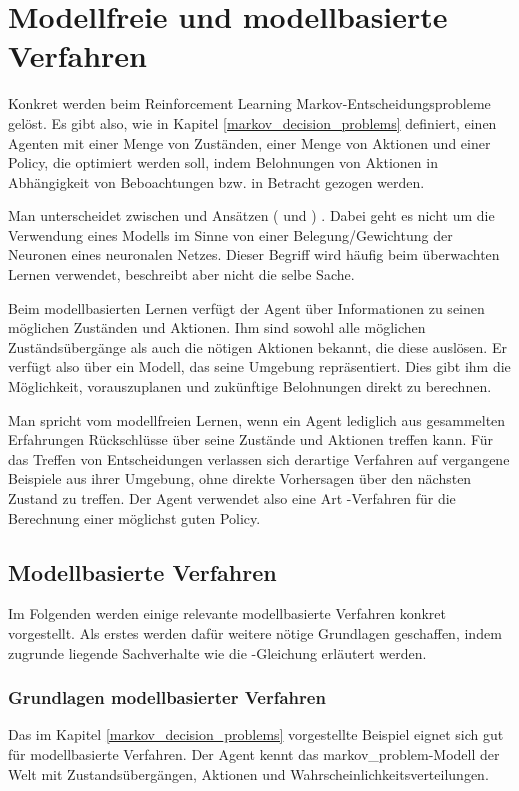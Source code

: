 \section{Modellfreie und modellbasierte Verfahren}\label{reinforcement_learning_basics}
Konkret werden beim Reinforcement Learning Markov-Entscheidungsprobleme gelöst. Es gibt also, wie in Kapitel \ref{markov_decision_problems} definiert, einen Agenten mit einer Menge von Zuständen, einer Menge von Aktionen und einer Policy, die optimiert werden soll, indem Belohnungen von Aktionen in Abhängigkeit von Beboachtungen bzw.  in Betracht gezogen werden. 

Man unterscheidet zwischen  und  Ansätzen ( und ) \cite{berkely_modelfree_modelbased_rl}. Dabei geht es nicht um die Verwendung eines Modells im Sinne von einer Belegung/Gewichtung der Neuronen eines neuronalen Netzes. Dieser Begriff wird häufig beim überwachten Lernen verwendet, beschreibt aber nicht die selbe Sache.

Beim modellbasierten Lernen verfügt der Agent über Informationen zu seinen möglichen Zuständen und Aktionen. Ihm sind sowohl alle möglichen Zuständsübergänge als auch die nötigen Aktionen bekannt, die diese auslösen. Er verfügt also über ein Modell, das seine Umgebung repräsentiert. Dies gibt ihm die Möglichkeit, vorauszuplanen und zukünftige Belohnungen direkt zu berechnen.

Man spricht vom modellfreien Lernen, wenn ein Agent lediglich aus gesammelten Erfahrungen Rückschlüsse über seine Zustände und Aktionen treffen kann. Für das Treffen von Entscheidungen verlassen sich derartige Verfahren auf vergangene Beispiele aus ihrer Umgebung, ohne direkte Vorhersagen über den nächsten Zustand zu treffen. Der Agent verwendet also eine Art -Verfahren für die Berechnung einer möglichst guten Policy.



\subsection{Modellbasierte Verfahren}
Im Folgenden werden einige relevante modellbasierte Verfahren konkret vorgestellt. Als erstes werden dafür weitere nötige Grundlagen geschaffen, indem zugrunde liegende Sachverhalte wie die -Gleichung erläutert werden.


\subsubsection{Grundlagen modellbasierter Verfahren}
Das im Kapitel \ref{markov_decision_problems} vorgestellte Beispiel eignet sich gut für modellbasierte Verfahren. Der Agent kennt das \ac{markov_problem}-Modell der Welt mit Zustandsübergängen, Aktionen und Wahrscheinlichkeitsverteilungen.

